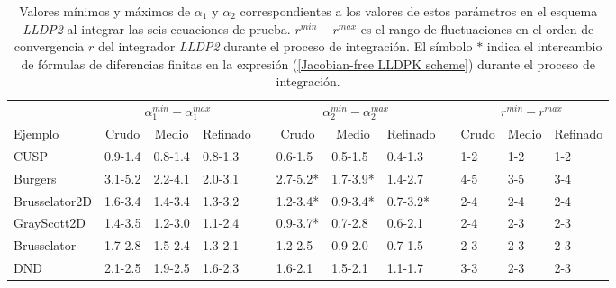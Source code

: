 \begin{table}[htb]
	\caption{Valores mínimos y máximos de $\alpha _{1}$ y $\alpha _{2}$ correspondientes a los valores de estos parámetros en el esquema \emph{LLDP2} al integrar las seis ecuaciones de prueba. $r^{min}-r^{max}$ es el rango de fluctuaciones en el orden de convergencia $r$ del integrador \emph{LLDP2} durante el proceso de integración. El símbolo $*$ indica el intercambio de fórmulas de diferencias finitas en la expresión (\ref{Jacobian-free LLDPK scheme}) durante el proceso de integración.}
	\label{tab:R_LLDP2}
	\begin{adjustbox}{width=0.95\columnwidth,center}
		\begin{tabular}{lccccccccccc}
			& \multicolumn{3}{c}{$\alpha^{min}_{1}-\alpha^{max}_{1}$} &  & \multicolumn{3}{c}{$\alpha^{min}_{2}-\alpha^{max}_{2}$} &  & \multicolumn{3}{c}{$r^{min}-r^{max}$} \\
			\cline{2-4}\cline{6-8}\cline{10-12} Ejemplo & Crudo & Medio & Refinado &  & Crudo & Medio & Refinado &  & Crudo & Medio & Refinado \\
			\hline
			CUSP & \multicolumn{1}{l}{0.9-1.4} & \multicolumn{1}{l}{0.8-1.4} & \multicolumn{1}{l}{0.8-1.3} &  & \multicolumn{1}{l}{0.6-1.5} & \multicolumn{1}{l}{0.5-1.5} & \multicolumn{1}{l}{0.4-1.3} &  & \multicolumn{1}{l}{1-2} & \multicolumn{1}{l}{1-2} & \multicolumn{1}{l}{1-2} \\
			Burgers & \multicolumn{1}{l}{3.1-5.2} & \multicolumn{1}{l}{2.2-4.1} & \multicolumn{1}{l}{2.0-3.1} &  & \multicolumn{1}{l}{2.7-5.2*} & \multicolumn{1}{l}{1.7-3.9*} & \multicolumn{1}{l}{1.4-2.7} &  & \multicolumn{1}{l}{4-5} & \multicolumn{1}{l}{3-5} & \multicolumn{1}{l}{3-4} \\
			Brusselator2D & \multicolumn{1}{l}{1.6-3.4} & \multicolumn{1}{l}{1.4-3.4} & \multicolumn{1}{l}{1.3-3.2} &  & \multicolumn{1}{l}{1.2-3.4*} & \multicolumn{1}{l}{0.9-3.4*} & \multicolumn{1}{l}{0.7-3.2*} &  & \multicolumn{1}{l}{2-4} & \multicolumn{1}{l}{2-4} & \multicolumn{1}{l}{2-4} \\
			GrayScott2D & \multicolumn{1}{l}{1.4-3.5} & \multicolumn{1}{l}{1.2-3.0} & \multicolumn{1}{l}{1.1-2.4} &  & \multicolumn{1}{l}{0.9-3.7*} & \multicolumn{1}{l}{0.7-2.8} & \multicolumn{1}{l}{0.6-2.1} &  & \multicolumn{1}{l}{2-4} & \multicolumn{1}{l}{2-3} & \multicolumn{1}{l}{2-3} \\
			Brusselator & \multicolumn{1}{l}{1.7-2.8} & \multicolumn{1}{l}{1.5-2.4} & \multicolumn{1}{l}{1.3-2.1} &  & \multicolumn{1}{l}{1.2-2.5} & \multicolumn{1}{l}{0.9-2.0} & \multicolumn{1}{l}{0.7-1.5} &  & \multicolumn{1}{l}{2-3} & \multicolumn{1}{l}{2-3} & \multicolumn{1}{l}{2-3} \\
			DND & \multicolumn{1}{l}{2.1-2.5} & \multicolumn{1}{l}{1.9-2.5} & \multicolumn{1}{l}{1.6-2.3} &  & \multicolumn{1}{l}{1.6-2.1} & \multicolumn{1}{l}{1.5-2.1} & \multicolumn{1}{l}{1.1-1.7} &  & \multicolumn{1}{l}{3-3} & \multicolumn{1}{l}{2-3} & \multicolumn{1}{l}{2-3} \\
			\hline
		\end{tabular}
	\end{adjustbox}
\end{table}
\vphantom{aa}

